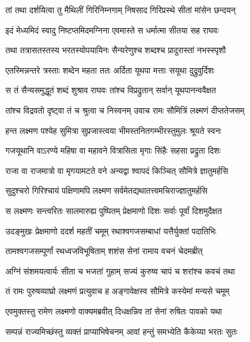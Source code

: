 
\twolineshloka
{तां तथा दर्शयित्वा तु मैथिलीं गिरिनिम्नगाम्}
{निषसाद गिरिप्रस्थे सीतां मांसेन छन्दयन्} %

\twolineshloka
{इदं मेध्यमिदं स्वादु निष्टप्तमिदमग्निना}
{एवमास्ते स धर्मात्मा सीतया सह राघवः} %

\twolineshloka
{तथा तत्रासतस्तस्य भरतस्योपयायिनः}
{सैन्यरेणुश्च शब्दश्च प्रादुरास्तां नभस्स्पृशौ} %

\twolineshloka
{एतस्मिन्नन्तरे त्रस्ताः शब्देन महता ततः}
{अर्दिता यूथपा मत्ताः सयूथा दुद्रुवुर्दिशः} %

\twolineshloka
{स तं सैन्यसमुद्धूतं शब्दं शुश्राव राघवः}
{तांश्च विप्रद्रुतान् सर्वान् यूथपानन्ववैक्षत} %

\twolineshloka
{तांश्च विद्रवतो दृष्ट्वा तं च श्रुत्वा च निस्वनम्}
{उवाच रामः सौमित्रिं लक्ष्मणं दीप्ततेजसम्} %

\twolineshloka
{हन्त लक्ष्मण पश्येह सुमित्रा सुप्रजास्त्वया}
{भीमस्तनितगम्भीरस्तुमुलः श्रूयते स्वनः} %

\twolineshloka
{गजयूथानि वाऽरण्ये महिषा वा महावने}
{वित्रासिता मृगाः सिंहैः सहसा प्रद्रुता दिशः} %

\twolineshloka
{राजा वा राजमात्रो वा मृगयामटते वने}
{अन्यद्वा श्वापदं किञ्चित् सौमित्रे ज्ञातुमर्हसि} %

\twolineshloka
{सुदुश्चरो गिरिश्चायं पक्षिणामपि लक्ष्मण}
{सर्वमेतद्यथातत्त्वमचिराज्ज्ञातुमर्हसि} %

\twolineshloka
{स लक्ष्मणः सन्त्वरितः सालमारुह्य पुष्पितम्}
{प्रेक्षमाणो दिशः सर्वाः पूर्वां दिशमुदैक्षत} %

\twolineshloka
{उदङ्मुखः प्रेक्षमाणो ददर्श महतीं चमूम्}
{रथाश्वगजसम्बाधां यत्तैर्युक्तां पदातिभिः} %

\twolineshloka
{तामश्वगजसम्पूर्णां रथध्वजविभूषिताम्}
{शशंस सेनां रामाय वचनं चेदमब्रीत्} %

\twolineshloka
{अग्निं संशमयत्वार्यः सीता च भजतां गुहाम्}
{सज्यं कुरुष्व चापं च शरांश्च कवचं तथा} %

\twolineshloka
{तं रामः पुरुषव्याघ्रो लक्ष्मणं प्रत्युवाच ह}
{अङ्गावेक्षस्व सौमित्रे कस्येमां मन्यसे चमूम्} %

\twolineshloka
{एवमुक्तस्तु रामेण लक्ष्मणो वाक्यमब्रवीत्}
{दिधक्षन्निव तां सेनां रुषितः पावको यथा} %

\twolineshloka
{सम्पन्नं राज्यमिच्छंस्तु व्यक्तं प्राप्याभिषेचनम्}
{आवां हन्तुं समभ्येति कैकेय्या भरतः सुतः} %

